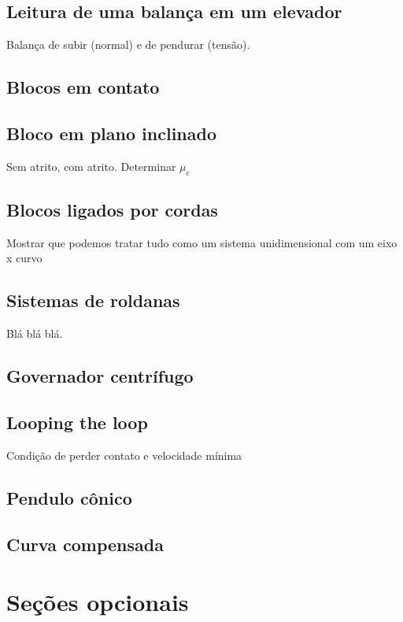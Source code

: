 \subsection{Leitura de uma balança em um elevador} 
Balança de subir (normal) e de pendurar (tensão).

\subsection{Blocos em contato}

\subsection{Bloco em plano inclinado}
Sem atrito, com atrito. Determinar $\mu_e$

\subsection{Blocos ligados por cordas}
Mostrar que podemos tratar tudo como um sistema unidimensional com um eixo x curvo

\subsection{Sistemas de roldanas}
Blá blá blá.

\subsection{Governador centrífugo} %

\subsection{Looping the loop}
Condição de perder contato e velocidade mínima

\subsection{Pendulo cônico}

\subsection{Curva compensada}

\section{Seções opcionais}

